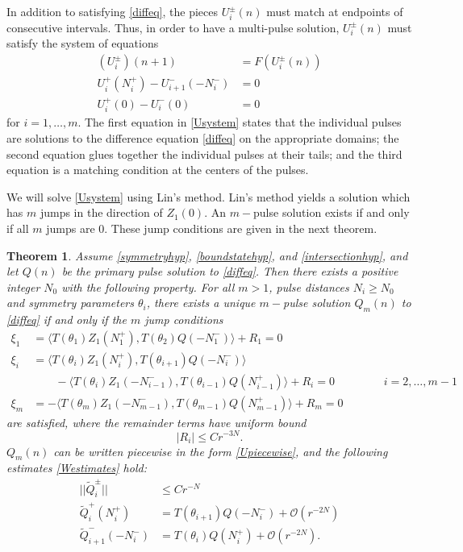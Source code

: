 \documentclass[12pt]{elsarticle}
\newtheorem{theorem}{Theorem}
\begin{document}
In addition to satisfying \cref{diffeq}, the pieces $U_i^\pm(n)$ must match at endpoints of consecutive intervals. Thus, in order to have a multi-pulse solution, $U_i^\pm(n)$ must satisfy the system of equations
\begin{equation}\label{Usystem}
\begin{aligned}
(U_i^\pm)(n+1) &= F(U_i^\pm(n))  \\
U_i^+(N_i^+) - U_{i+1}^-(-N_i^-) &= 0 \\
U_i^+(0) - U_i^-(0) &= 0
\end{aligned}
\end{equation}
for $i = 1, \dots, m$. The first equation in \cref{Usystem} states that the individual pulses are solutions to the difference equation \cref{diffeq} on the appropriate domains; the second equation glues together the individual pulses at their tails; and the third equation is a matching condition at the centers of the pulses.

We will solve \cref{Usystem} using Lin's method. Lin's method yields a solution which has $m$ jumps in the direction of $Z_1(0)$. An $m-$pulse solution exists if and only if all $m$ jumps are 0. These jump conditions are given in the next theorem.

\begin{theorem}\label{ntmulti}
Assume \cref{symmetryhyp}, \cref{boundstatehyp}, and \cref{intersectionhyp}, and let $Q(n)$ be the primary pulse solution to \cref{diffeq}. Then there exists a positive  integer $N_0$ with the following property. For all $m > 1$, pulse distances $N_i \geq N_0$ and symmetry parameters $\theta_i$, there exists a unique $m-$pulse solution $Q_m(n)$ to \cref{diffeq} if and only if the $m$ jump conditions 
\begin{equation}\label{jumpcondexist}
\begin{aligned}
\xi_1 &= \langle T(\theta_1) Z_1(N_1^+), T(\theta_{2}) Q(-N_1^-) \rangle + R_1 = 0 \\
\xi_i &= \langle T(\theta_i) Z_1(N_i^+), T(\theta_{i+1}) Q(-N_i^-) \rangle \\
&\qquad-\langle T(\theta_i) Z_1(-N_{i-1}^-), T(\theta_{i-1}) Q(N_{i-1}^+) \rangle + R_i = 0 && \qquad i = 2, \dots, m-1 \\
\xi_m &= -\langle T(\theta_m) Z_1(-N_{m-1}^-), T(\theta_{m-1}) Q(N_{m-1}^+) \rangle + R_m = 0
\end{aligned}
\end{equation}
are satisfied, where the remainder terms have uniform bound
\[
|R_i| \leq C r^{-3N}.
\]
$Q_m(n)$ can be written piecewise in the form \cref{Upiecewise}, and the following estimates \cref{Westimates} hold:
\begin{equation}\label{Westimates}
\begin{aligned}
||\tilde{Q}_i^\pm|| &\leq C r^{-N} \\
\tilde{Q}_i^+(N_i^+) &= T(\theta_{i+1}) Q(-N_i^-) + \mathcal{O}(r^{-2N}) \\
\tilde{Q}_{i+1}^-(-N_i^-) &= T(\theta_i) Q(N_i^+) + \mathcal{O}(r^{-2N}) .
\end{aligned}
\end{equation}
\end{theorem}
\end{document}
